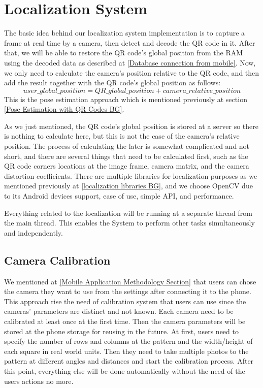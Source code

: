 \section{Localization System}
\label{Localization System Methodology}
The basic idea behind our localization system implementation is to capture a frame at real time by a camera, then detect and decode the QR code in it. After that, we will be able to restore the QR code's global position from the RAM using the decoded data as described at \ref{Database connection from mobile}. Now, we only need to calculate the camera's position relative to the QR code, and then add the result together with the QR code's global position as follows:
\[ user\_global\_position = QR\_global\_position +  camera\_relative\_position\]
This is the pose estimation approach which is mentioned previously at section \ref{Pose Estimation with QR Codes BG}.

As we just mentioned, the QR code's global position is stored at a server so there is nothing to calculate here, but this is not the case of the camera's relative position. The process of calculating the later is somewhat complicated and not short, and there are several things that need to be calculated first, such as the QR code corners locations at the image frame, camera matrix, and the camera distortion coefficients. There are multiple libraries for localization purposes as we mentioned previously at \ref{localization libraries BG}, and we choose OpenCV due to its Android devices support, ease of use, simple API, and performance.

Everything related to the localization will be running at a separate thread from the main thread. This enables the System to perform other tasks simultaneously and independently.

\subsection{Camera Calibration} \label{sec:camera_calibration}
We mentioned at \ref{Mobile Application Methodology Section} that users can chose the camera they want to use from the settings after connecting it to the phone. This approach rise the need of calibration system that users can use since the cameras' parameters are distinct and not known. Each camera need to be calibrated at least once at the first time. Then the camera parameters will be stored at the phone storage for reusing in the future. At first, users need to specify the number of rows and columns at the pattern and the width/height of each square in real world units. Then they need to take multiple photos to the pattern at different angles and distances and start the calibration process. After this point, everything else will be done automatically without the need of the users actions no more. 

